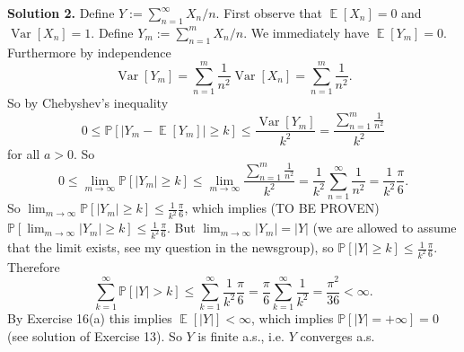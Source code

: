\documentclass[12pt,a4paper]{report}
\theoremstyle{definition}
\theoremstyle{num.custom-title}
\DeclareMathOperator{\E}{\mathbb{E}}
\DeclareMathOperator{\Var}{Var}
\renewcommand{\1}{\mathbbm{1}}
\renewcommand{\P}{\mathbb{P}}
\begin{document}
\noindent\textbf{Solution 2.} Define $Y := \sum_{n=1}^\infty X_n/n$. First observe that $\E[X_n]=0$ and $\Var[X_n]=1$. Define $Y_m := \sum_{n=1}^m X_n/n$. We immediately have $\E[Y_m]=0$. Furthermore by independence
\[
\Var[Y_m] = \sum_{n=1}^m \frac{1}{n^2} \Var[X_n] = \sum_{n=1}^m \frac{1}{n^2}.
\]
So by Chebyshev's inequality
\[
0 \leq \P[ |Y_m - \E[Y_m]| \geq k] \leq \frac{\Var[Y_m]}{k^2} = \frac{\sum_{n=1}^m \frac{1}{n^2}}{k^2}
\]
for all $a>0$. So
\[
0 \leq \lim_{m \to \infty} \P[ |Y_m| \geq k] \leq \lim_{m \to \infty} \frac{\sum_{n=1}^m \frac{1}{n^2}}{k^2} = \frac{1}{k^2} \sum_{n=1}^\infty \frac{1}{n^2} = \frac{1}{k^2} \frac{\pi}{6}.
\]
So $\lim_{m \to \infty} \P[ |Y_m| \geq k] \leq \frac{1}{k^2} \frac{\pi}{6}$, which implies (TO BE PROVEN) $\P[\lim_{m \to \infty} |Y_m| \geq k] \leq \frac{1}{k^2} \frac{\pi}{6}$. But $\lim_{m \to \infty} |Y_m| = |Y|$ (we are allowed to assume that the limit exists, see my question in the newsgroup), so $\P[|Y| \geq k] \leq \frac{1}{k^2} \frac{\pi}{6}$. Therefore
\[
\sum_{k=1}^\infty \P[|Y|>k] \leq \sum_{k=1}^\infty \frac{1}{k^2} \frac{\pi}{6} = \frac{\pi}{6} \sum_{k=1}^\infty \frac{1}{k^2} = \frac{\pi^2}{36} < \infty.
\]
By Exercise 16(a) this implies $\E[|Y|]<\infty$, which implies $\P[|Y|=+\infty]=0$ (see solution of Exercise 13). So $Y$ is finite a.s., i.e. $Y$ converges a.s.
\end{document}
